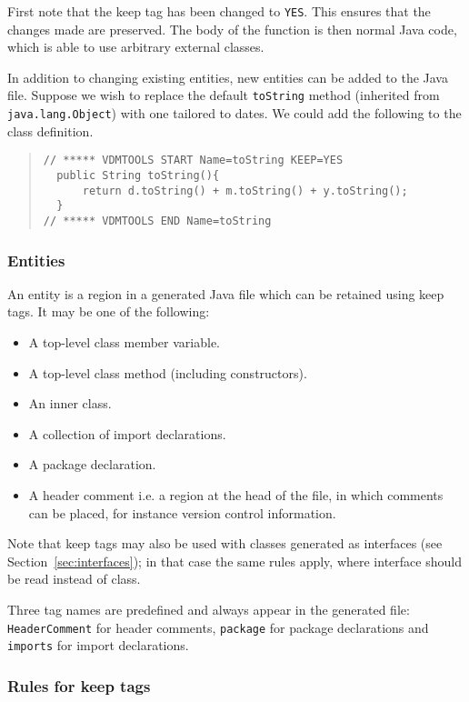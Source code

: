 \documentclass[\pformat,11pt]{article}
\begin{document}
First note that the keep tag has been changed to \texttt{YES}. This
ensures that the changes made are preserved. The body of the function
is then normal Java code, which is able to use arbitrary external
classes. 

In addition to changing existing entities, new entities can be added
to the Java file. Suppose we wish to replace the default
\texttt{toString} method (inherited from \texttt{java.lang.Object})
with one tailored to dates. We could add the following to the class
definition. 
\begin{quote}
\begin{verbatim}
// ***** VDMTOOLS START Name=toString KEEP=YES
  public String toString(){
      return d.toString() + m.toString() + y.toString();
  }
// ***** VDMTOOLS END Name=toString
\end{verbatim}
\end{quote}

\subsubsection{Entities}

An entity is a region in a generated Java file which can be retained
using keep tags. It may be one of the following:
\begin{itemize}
\item A top-level class member variable.
\item A top-level class method (including constructors).
\item An inner class.
\item A collection of import declarations.
\item A package declaration.
\item A header comment i.e. a region at the head of the file, in which
comments can be placed, for instance version control information. 
\end{itemize}
Note that keep tags may also be used with classes generated as
interfaces (see Section~\ref{sec:interfaces}); in that case the same
rules apply, where interface should be read instead of class.

Three tag names are predefined and always appear in the generated
file: \texttt{HeaderComment} for header comments, \texttt{package} for
package declarations and \texttt{imports} for import declarations. 

\subsubsection{Rules for keep tags}
\end{document}
